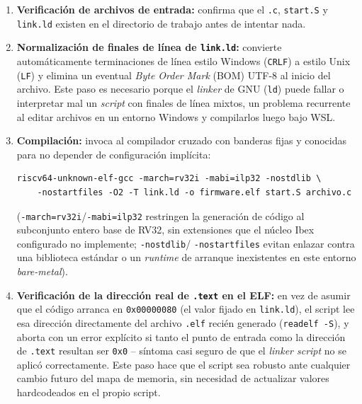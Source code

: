 \begin{enumerate}
    \item \textbf{Verificación de archivos de entrada:} confirma que el
    \texttt{.c}, \texttt{start.S} y \texttt{link.ld} existen en el
    directorio de trabajo antes de intentar nada.

    \item \textbf{Normalización de finales de línea de \texttt{link.ld}:}
    convierte automáticamente terminaciones de línea estilo Windows
    (\texttt{CRLF}) a estilo Unix (\texttt{LF}) y elimina un eventual
    \textit{Byte Order Mark} (BOM) UTF-8 al inicio del archivo. Este paso
    es necesario porque el \textit{linker} de GNU (\texttt{ld}) puede
    fallar o interpretar mal un \textit{script} con finales de línea
    mixtos, un problema recurrente al editar archivos en un entorno
    Windows y compilarlos luego bajo WSL.

    \item \textbf{Compilación:} invoca al compilador cruzado con
    banderas fijas y conocidas para no depender de configuración
    implícita:

\begin{lstlisting}[style=bashstyle]
riscv64-unknown-elf-gcc -march=rv32i -mabi=ilp32 -nostdlib \
    -nostartfiles -O2 -T link.ld -o firmware.elf start.S archivo.c
\end{lstlisting}

    (\texttt{-march=rv32i}/\texttt{-mabi=ilp32} restringen la generación
    de código al subconjunto entero base de RV32, sin extensiones que el
    núcleo Ibex configurado no implemente; \texttt{-nostdlib}/
    \texttt{-nostartfiles} evitan enlazar contra una biblioteca estándar o
    un \textit{runtime} de arranque inexistentes en este entorno
    \textit{bare-metal}).

    \item \textbf{Verificación de la dirección real de \texttt{.text} en
    el ELF:} en vez de asumir que el código arranca en
    \texttt{0x00000080} (el valor fijado en \texttt{link.ld}), el script
    lee esa dirección directamente del archivo \texttt{.elf} recién
    generado (\texttt{readelf -S}), y aborta con un error explícito si
    tanto el punto de entrada como la dirección de \texttt{.text}
    resultan ser \texttt{0x0} -- síntoma casi seguro de que el
    \textit{linker script} no se aplicó correctamente. Este paso hace que
    el script sea robusto ante cualquier cambio futuro del mapa de
    memoria, sin necesidad de actualizar valores hardcodeados en el
    propio script.


\end{enumerate}
